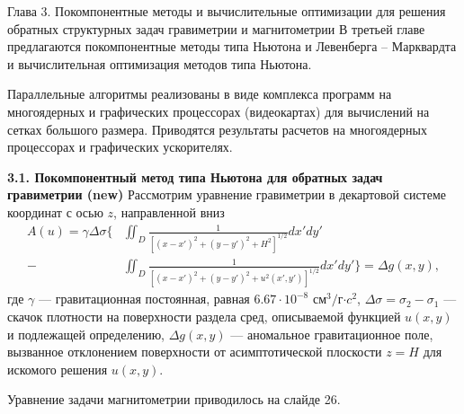 \documentclass[10pt,pdf, mathserif, hyperref={unicode}]{beamer}
\begin{document}
\begin{frame}{Глава 3. Покомпонентные методы и вычислительные оптимизации для решения обратных структурных задач гравиметрии и магнитометрии}
	В третьей главе предлагаются покомпонентные методы типа Ньютона и Левенберга -- Марквардта и вычислительная оптимизация методов типа Ньютона. 
	
	Параллельные алгоритмы реализованы в виде комплекса программ на многоядерных и графических процессорах (видеокартах) для вычислений на сетках большого размера. Приводятся результаты расчетов на многоядерных процессорах и графических ускорителях. 
	
\end{frame}
\begin{frame}{\small\textbf{3.1. Покомпонентный метод типа Ньютона для обратных задач гравиметрии (new)}}
	Рассмотрим уравнение гравиметрии в декартовой системе координат с осью $z$, направленной вниз 
	\begin{equation*}
	\begin{aligned}
	A(u)=\gamma\Delta\sigma \bigg\{ &\iint_{D} \frac{1}{[(x-x')^2+(y-y')^2+H^2]^{1/2}}dx'dy' \\
	- &\iint_{D} \frac{1}{[(x-x')^2+(y-y')^2+u^2(x',y')]^{1/2}}dx'dy'\bigg\}=\Delta g(x,y),
	\end{aligned} 
	\end{equation*}
	где $\gamma$ --- гравитационная постоянная, равная $6.67\cdot10^{-8}$ см$^3/$г$\cdot c^2$, $\Delta\sigma=\sigma_2-\sigma_1$ --- скачок плотности на поверхности раздела сред, описываемой функцией $u(x,y)$ и подлежащей определению, $\Delta g(x,y)$ --- аномальное гравитационное поле, вызванное отклонением поверхности от асимптотической плоскости $z=H$ для искомого решения $u(x,y)$.
	
	Уравнение задачи магнитометрии приводилось на слайде 26.
\end{frame}
\end{document}
